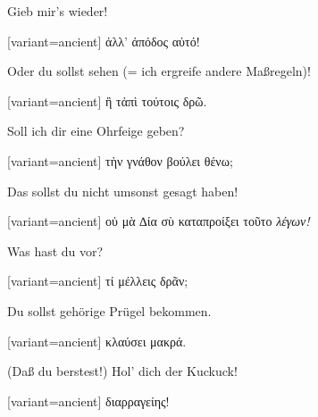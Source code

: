 Gieb mir's wieder!

\switchcolumn

\begin{greek}[variant=ancient]%
ἀλλ’ ἀπόδος αὐτό!

\end{greek}%
\switchcolumn*

Oder du sollst sehen (= ich ergreife andere Maßregeln)!

\switchcolumn

\begin{greek}[variant=ancient]%
ἢ τἀπὶ τούτοις δρῶ.

\end{greek}%
\switchcolumn*

Soll ich dir eine Ohrfeige geben?

\switchcolumn

\begin{greek}[variant=ancient]%
τὴν γνάθον βούλει θένω;

\end{greek}%
\switchcolumn*

Das sollst du nicht umsonst gesagt haben!

\switchcolumn

\begin{greek}[variant=ancient]%
οὐ μὰ ∆ία σὺ καταπροίξει τοῦτο \emph{λέγων!}

\end{greek}%
\switchcolumn*

Was hast du vor?

\switchcolumn

\begin{greek}[variant=ancient]%
τί μέλλεις δρᾶν;

\end{greek}%
\switchcolumn*

Du sollst gehörige Prügel bekommen.

\switchcolumn

\begin{greek}[variant=ancient]%
κλαύσει μακρά.

\end{greek}%
\switchcolumn*

(Daß du berstest!) Hol' dich der Kuckuck!

\switchcolumn

\begin{greek}[variant=ancient]%
διαρραγείης!

\end{greek}%
\switchcolumn*

